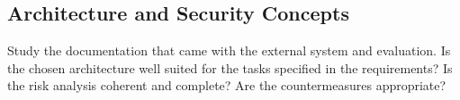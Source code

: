 \subsection{Architecture and Security Concepts}

Study the documentation that came with the external system and
evaluation.
Is the chosen architecture well suited for the tasks specified in the 
requirements?  Is the risk analysis coherent and complete?   Are the
countermeasures appropriate?


